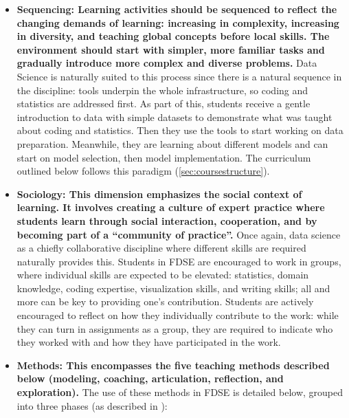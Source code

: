 \begin{itemize}
    \item{\bf Sequencing: Learning activities should be sequenced to reflect the changing demands of learning: increasing in complexity, increasing in diversity, and teaching global concepts before local skills. The environment should start with simpler, more familiar tasks and gradually introduce more complex and diverse problems.} Data Science is naturally suited to this process since there is a natural sequence in the discipline: tools underpin the whole infrastructure, so coding and statistics are addressed first. As part of this, students receive a gentle introduction to data with simple datasets to demonstrate what was taught about coding and statistics. Then they use the tools to start working on data preparation. Meanwhile, they are learning about different models and can start on model selection, then model implementation. The curriculum outlined below follows this paradigm (\autoref{sec:coursestructure}).
    
    \item{\bf Sociology: This dimension emphasizes the social context of learning. It involves creating a culture of expert practice where students learn through social interaction, cooperation, and by becoming part of a ``community of practice''.} Once again, data science as a chiefly collaborative discipline where different skills are required naturally provides this. Students in FDSE are encouraged to work in groups, where individual skills are expected to be elevated: statistics, domain knowledge, coding expertise, visualization skills, and writing skills; all and more can be key to providing one's contribution. Students are actively encouraged to reflect on how they individually contribute to the work: while they can turn in assignments as a group, they are required to indicate who they worked with and how they have participated in the work.
    
    \item{\bf Methods: This encompasses the five teaching methods described below (modeling, coaching, articulation, reflection, and exploration).} The use of these methods in FDSE is detailed below, grouped into three phases (as described in \cite{knilt2019modeling}):
\end{itemize}

